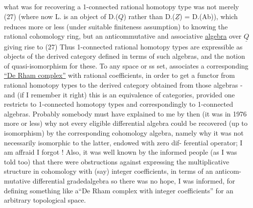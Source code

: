 
what was  for recovering a 1-connected rational homotopy type
was not merely (27)  (where now L. is an object of  D.($\underline{Q}$) rather than 
D.($\underline{Z}$) = D.(Ab)),  which reduces more or less  (under suitable
finiteness assumption) to knowing the rational cohomology ring,  but
an anticommutative and associative  \uline{algebra}  over $\underline{Q}$ \over{,}{(}giving rise to (27)
Thus 1-connected rational homotopy types are expressible as objects of
the derived category defined in terms of such algebras,  and the  notion
of quasi-isomorphism for these.  To any space or ss set,   associates
a corresponding \uline{``De Rham complex''}  with rational coefficients,  in order
to get a functor from rational homotopy types to the derived category
obtained from those algebras  -  and (if I remember it right)  this is
an equivalence of categories,  provided one restricts to 1-connected
homotopy types\hand{,} and correspondingly to 1-connected algebras.  Probably
somebody must have explained to me by then (it was in 1976 more or less)
why not every eligible differential algebra could be recovered (up to
isomorphism) by the corresponding  cohomology  algebra,  namely why
it was not necessarily isomorphic to the latter,  endowed with zero dif-%
ferential operator;   I am affraid I forgot  !  Also,  it was
well known by the informed people  (as I was told too) that
there were obstructions against expressing the multiplicative structure
in cohomology with (say) integer coefficients,  in terms of an anticom-%
mutative differential gradedalgebra\over{,}{;}  so there was no hope,  I was
informed,  for defining something like a``De Rham complex with integer
coefficients'' for an arbitrary topological space.

